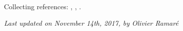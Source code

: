 Collecting references:
\cite{McCurley*84-2},
\cite{McCurley*84-3},
\cite{Kadiri*05-2}.

























  
\begin{flushright}\small\sl{}   Last updated on November 14th, 2017, by Olivier Ramar\'e
 \end{flushright}














